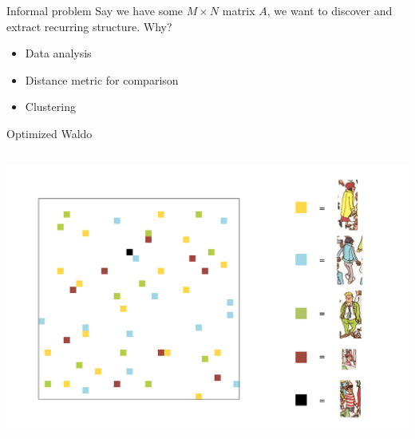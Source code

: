 \documentclass[11pt]{beamer}
\begin{document}

\begin{frame}{Informal problem}
Say we have some $M\times N$ matrix $A$, we want to discover and extract recurring structure.
Why?
\begin{itemize}
\item Data analysis
\item Distance metric for comparison
\item Clustering
\end{itemize}
\end{frame}



\begin{frame}{Optimized Waldo}
\nointerlineskip%
\begin{columns}
\column{\dimexpr\paperwidth}
\centering
\includegraphics[width=\paperwidth]{"optimal waldo"} 
\end{columns}
\end{frame}

\end{document}
